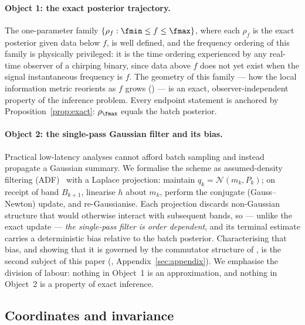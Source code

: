 \paragraph{Object 1: the exact posterior trajectory.}
The one-parameter family $\{\rho_f : \fmin \le f \le \fmax\}$, where
each $\rho_f$ is the exact posterior given data below $f$, is
well defined, and the frequency ordering of this family is physically
privileged: it is the time ordering experienced by any real-time
observer of a chirping binary, since data above $f$ does not yet exist
when the signal instantaneous frequency is $f$. The geometry of this
family --- how the local information metric reorients as $f$ grows
() --- is an exact, observer-independent property of
the inference problem. Every endpoint statement is anchored by
Proposition~\ref{prop:exact}: $\rho_{\fmax}$ equals the batch
posterior.

\paragraph{Object 2: the single-pass Gaussian filter and its bias.}
Practical low-latency analyses cannot afford batch sampling and instead
propagate a Gaussian summary. We formalise the scheme as
assumed-density filtering (ADF)~\cite{minka2001ep,opper1998online} with
a Laplace projection: maintain
$q_k = \mathcal{N}(m_k, P_k)$; on receipt of band $B_{k+1}$, linearise
$h$ about $m_k$, perform the conjugate (Gauss--Newton) update, and
re-Gaussianise. Each projection discards non-Gaussian structure that
would otherwise interact with subsequent bands, so --- unlike the exact
update --- \emph{the single-pass filter is order dependent}, and its
terminal estimate carries a deterministic bias relative to the batch
posterior. Characterising that bias, and showing that it is governed by
the commutator structure of , is the second
subject of this paper (, Appendix~\ref{sec:appendix}).
We emphasise the division of labour: nothing in Object~1 is an
approximation, and nothing in Object~2 is a property of exact
inference.

\subsection{Coordinates and invariance}
\label{sec:coordinates}


